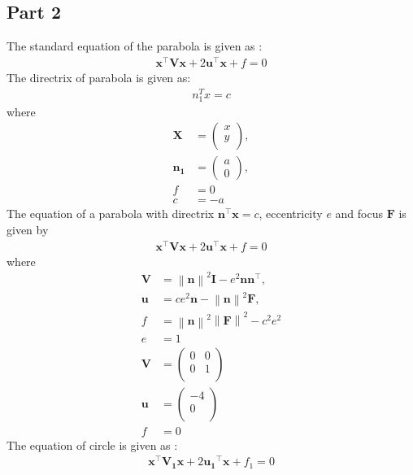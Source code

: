\documentclass[journal,10pt,twocolumn]{article}
\providecommand{\norm}[1]{\left\lVert#1\right\rVert}
\let\vec\mathbf
\newcommand{\myvec}[1]{\ensuremath{\begin{pmatrix}#1\end{pmatrix}}}
\begin{document}
\subsection*{Part 2}
The standard equation of the parabola is given as :
\begin{align}
\vec{x}^{\top}\vec{V}\vec{x}+2\vec{u}^{\top}\vec{x}+f=0
\end{align}
The directrix of parabola is given as:
\begin{align}
		n_1^Tx=c	
\end{align}
where
\begin{align}
	\label{eq:V_matrix}
	\vec{X} &= \myvec{x \\
	                   y \\},
	\\
	\label{eq:u_vector}
	\vec{n_1} &= \myvec{a\\0},
	\\
	\label{eq:f_value}
	f &= 0
	\\
	c&=-a
\end{align}
The equation of  a parabola with directrix $\vec{n}^{\top}\vec{x} = c$, eccentricity $e$ and focus $\vec{F}$ is given by 
\begin{align}
    \label{eq:conic_quad_form}
    \vec{x}^{\top}\vec{V}\vec{x}+2\vec{u}^{\top}\vec{x}+f=0
    \end{align}
where     
\begin{align}
  \label{eq:conic_quad_form_v}
\vec{V} &=\norm{\vec{n}}^2\vec{I}-e^2\vec{n}\vec{n}^{\top}, 
\\
\label{eq:conic_quad_form_u}
\vec{u} &= ce^2\vec{n}-\norm{\vec{n}}^2\vec{F}, 
\\
\label{eq:conic_quad_form_f}
f &= \norm{\vec{n}}^2\norm{\vec{F}}^2-c^2e^2
\\
e&=1
\\
\vec{V}&=\begin{pmatrix}
	0 & 0\\
	0 & 1\\
	\end{pmatrix} \\
    \vec{u}&=\begin{pmatrix}
	-4 \\
	0 \\
	\end{pmatrix} \\
	f&=0
    \end{align}
The equation of circle is given as :
\begin{align}
    \label{eq:conic_quad_form}
    \vec{x}^{\top}\vec{V_1}\vec{x}+2\vec{u_1}^{\top}\vec{x}+f_1=0
    \end{align}
\end{document}
